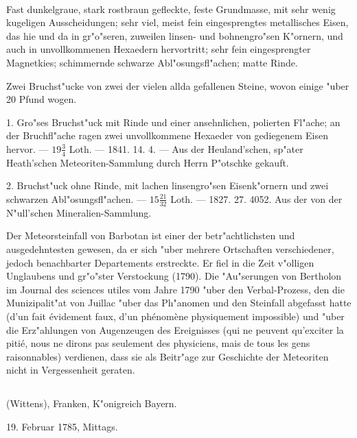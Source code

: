 \documentclass[a4paper, 11pt, oneside, polutonikogreek, german]{article}
\begin{document}
\paragraph{}
Fast dunkelgraue, stark rostbraun gefleckte, feste Grundmasse, mit sehr wenig kugeligen Ausscheidungen; sehr viel, meist fein eingesprengtes metallisches Eisen, das hie und da in gr"o"seren, zuweilen linsen- und bohnengro"sen K"ornern, und auch in unvollkommenen Hexaedern hervortritt; sehr fein eingesprengter Magnetkies; schimmernde schwarze Abl"osungsfl"achen; matte Rinde.

Zwei Bruchst"ucke von zwei der vielen allda gefallenen Steine, wovon einige "uber 20 Pfund wogen.

1. Gro"ses Bruchst"uck mit Rinde und einer ansehnlichen, polierten Fl"ache; an der Bruchfl"ache ragen zwei unvollkommene Hexaeder von gediegenem Eisen hervor. --- $\mathfrak{19\frac{3}{4}}$ Loth. --- 1841. 14. 4. --- Aus der Heuland'schen, sp"ater Heath'schen Meteoriten-Sammlung durch Herrn P"otschke gekauft.

2. Bruchst"uck ohne Rinde, mit lachen linsengro"sen Eisenk"ornern und zwei schwarzen Abl"osungsfl"achen. --- $\mathfrak{15\frac{21}{32}}$ Loth. --- 1827. 27. 4052. Aus der von der N"ull'schen Mineralien-Sammlung.

\setlength{\leftskip}{10mm}
\setlength{\parindent}{0pt}

{\footnotesize Der Meteorsteinfall von Barbotan ist einer der betr"achtlichsten und ausgedehntesten gewesen, da er sich "uber mehrere Ortschaften verschiedener, jedoch benachbarter Departements erstreckte. Er fiel in die Zeit v"olligen Unglaubens und gr"o"ster Verstockung (1790). Die "Au"serungen von Bertholon im Journal des sciences utiles vom Jahre 1790 "uber den Verbal-Prozess, den die Munizipalit"at von Juillac "uber das Ph"anomen und den Steinfall abgefasst hatte (d'un fait évidement faux, d'un phénomène physiquement impossible) und "uber die Erz"ahlungen von Augenzeugen des Ereignisses (qui ne peuvent qu'exciter la pitié, nous ne dirons pas seulement des physiciens, mais de tous les gens raisonnables) verdienen, dass sie als Beitr"age zur Geschichte der Meteoriten nicht in Vergessenheit geraten.}

\setlength{\leftskip}{0pt}
\setlength{\parindent}{20pt}

\subsection{}
\begin{center}

(Wittens), Franken, K"onigreich Bayern.

19. Februar 1785, Mittags.
\end{center}
\end{document}
